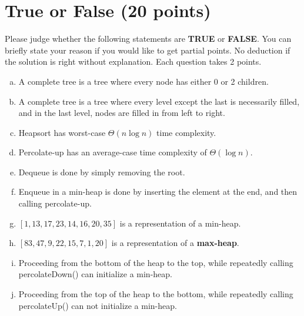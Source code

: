 \documentclass[11pt]{exam}
\begin{document}
\section{True or False (20 points)}
Please judge whether the following statements are \textbf{TRUE} or \textbf{FALSE}. You can briefly state your reason if you would like to get partial points. No deduction if the solution is right without explanation. Each question takes 2 points.
	\begin{enumerate}[a)]
		\item A complete tree is a tree where every node has either 0 or 2 children.
		\begin{solution}
\end{solution}
		\item A complete tree is a tree where every level except the last is necessarily filled, and in the last level, nodes are filled in from left to right.
\begin{solution}
\end{solution}
		\item Heapsort has worst-case $\Theta(n \log n)$ time complexity.
		\begin{solution}
\end{solution}
		\item  Percolate-up has an average-case time complexity of $\Theta(\log n)$.
\begin{solution}
\end{solution}
		\item Dequeue is done by simply removing the root.
\begin{solution}
\end{solution}
		\item Enqueue in a min-heap is done by inserting the element at the end, and then calling percolate-up.
\begin{solution}
\end{solution}
		\item $[1, 13, 17, 23, 14, 16, 20, 35]$ is a representation of a min-heap.
\begin{solution}
\end{solution}
		\item $[83, 47, 9, 22, 15, 7, 1, 20]$ is a representation of a \textbf{max-heap}.
\begin{solution}
\end{solution}
		\item  Proceeding from the bottom of the heap to the top, while repeatedly calling percolateDown() can initialize a min-heap.
\begin{solution}
\end{solution}
		\item Proceeding from the top of the heap to the bottom, while repeatedly calling percolateUp() can not initialize a min-heap.
		\begin{solution}
\end{solution}
	\end{enumerate}
\end{document}
